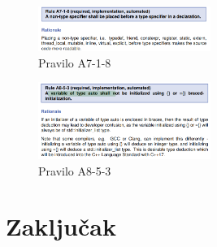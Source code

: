 \documentclass[12pt,oneside]{memoir}
\begin{document}
\begin{figure}[!ht]
  \centering
  \includegraphics[width=0.5\textwidth]{PraviloA718.png}
  \caption{Pravilo A7-1-8}
  \label{fig:grafikon}
\end{figure}

\begin{figure}[!ht]
  \centering
  \includegraphics[width=0.5\textwidth]{PraviloA853.png}
  \caption{Pravilo A8-5-3}
  \label{fig:grafikon}
\end{figure}





\chapter{Zaključak}


\literatura

\backmatter
\end{document}
